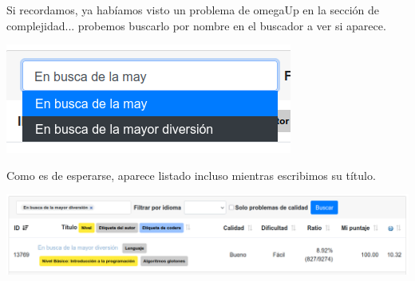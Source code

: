 \documentclass{beamer}
\begin{document}
    \begin{frame}[noframenumbering]
        Si recordamos, ya habíamos visto un problema de omegaUp en la sección de complejidad... \pause probemos buscarlo por nombre en el buscador a ver si aparece. \pause

        \begin{center}
            \includegraphics[width=.35\linewidth]{./res/ou_partial_search.png}
        \end{center} \pause

        Como es de esperarse, aparece listado incluso mientras escribimos su título. \pause

        \begin{center}
            \includegraphics[width=\linewidth]{./res/ou_searched.png}
        \end{center} 
    \end{frame}
\end{document}
